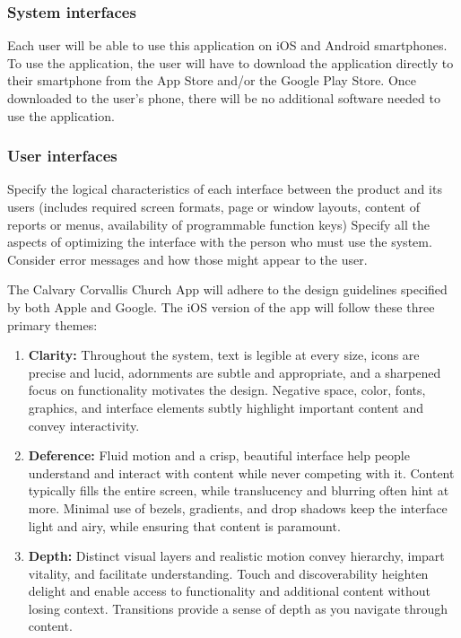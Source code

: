 \documentclass[letterpaper,10pt,draftclsnofoot,onecolumn,titlepage]{IEEEtran}
\begin{document}
	\subsubsection{System interfaces}
	Each user will be able to use this application on iOS and Android smartphones.
	To use the application, the user will have to download the application directly to their smartphone from the App Store and/or the Google Play Store.
	Once downloaded to the user's phone, there will be no additional software needed to use the application.

	\subsubsection{User interfaces}
	Specify the logical characteristics of each interface between the product and its users (includes required screen formats, page or window layouts, content of reports or menus, availability of programmable function keys)
	Specify all the aspects of optimizing the interface with the person who must use the system.
	Consider error messages and how those might appear to the user.

	The Calvary Corvallis Church App will adhere to the design guidelines specified by both Apple and Google.
	The iOS version of the app will follow these three primary themes:
	\begin{enumerate}
		\item \textbf{Clarity:} Throughout the system, text is legible at every size, icons are precise and lucid, adornments are subtle and appropriate, and a sharpened focus on functionality motivates the design. Negative space, color, fonts, graphics, and interface elements subtly highlight important content and convey interactivity.
		\item \textbf{Deference:} Fluid motion and a crisp, beautiful interface help people understand and interact with content while never competing with it. Content typically fills the entire screen, while translucency and blurring often hint at more. Minimal use of bezels, gradients, and drop shadows keep the interface light and airy, while ensuring that content is paramount.
		\item \textbf{Depth:} Distinct visual layers and realistic motion convey hierarchy, impart vitality, and facilitate understanding. Touch and discoverability heighten delight and enable access to functionality and additional content without losing context. Transitions provide a sense of depth as you navigate through content.
	\end{enumerate}
\end{document}
